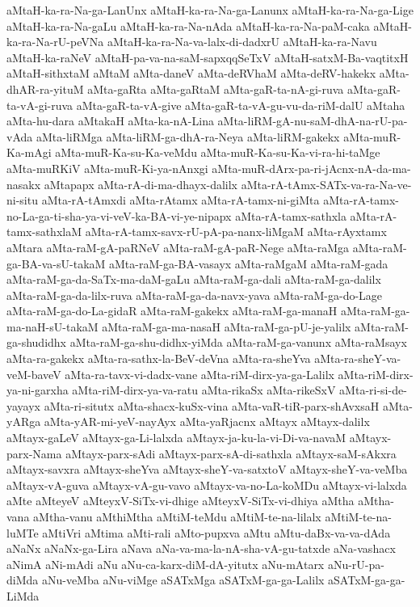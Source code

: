 {aMtaH-ka-ra-Na-ga-LanUnx
aMtaH-ka-ra-Na-ga-Lanunx
aMtaH-ka-ra-Na-ga-Lige
aMtaH-ka-ra-Na-gaLu
aMtaH-ka-ra-Na-nAda
aMtaH-ka-ra-Na-paM-caka
aMtaH-ka-ra-Na-rU-peVNa
aMtaH-ka-ra-Na-va-lalx-di-dadxrU
aMtaH-ka-ra-Navu
aMtaH-ka-raNeV
aMtaH-pa-va-na-saM-sapxqqSeTxV
aMtaH-satxM-Ba-vaqtitxH
aMtaH-sithxtaM
aMtaM
aMta-daneV
aMta-deRVhaM
aMta-deRV-hakekx
aMta-dhAR-ra-yituM
aMta-gaRta
aMta-gaRtaM
aMta-gaR-ta-nA-gi-ruva
aMta-gaR-ta-vA-gi-ruva
aMta-gaR-ta-vA-give
aMta-gaR-ta-vA-gu-vu-da-riM-dalU
aMtaha
aMta-hu-dara
aMtakaH
aMta-ka-nA-Lina
aMta-liRM-gA-nu-saM-dhA-na-rU-pa-vAda
aMta-liRMga
aMta-liRM-ga-dhA-ra-Neya
aMta-liRM-gakekx
aMta-muR-Ka-mAgi
aMta-muR-Ka-su-Ka-veMdu
aMta-muR-Ka-su-Ka-vi-ra-hi-taMge
aMta-muRKiV
aMta-muR-Ki-ya-nAnxgi
aMta-muR-dArx-pa-ri-jAcnx-nA-da-ma-nasakx
aMtapapx
aMta-rA-di-ma-dhayx-dalilx
aMta-rA-tAmx-SATx-va-ra-Na-ve-ni-situ
aMta-rA-tAmxdi
aMta-rAtamx
aMta-rA-tamx-ni-giMta
aMta-rA-tamx-no-La-ga-ti-sha-ya-vi-veV-ka-BA-vi-ye-nipapx
aMta-rA-tamx-sathxla
aMta-rA-tamx-sathxlaM
aMta-rA-tamx-savx-rU-pA-pa-nanx-liMgaM
aMta-rAyxtamx
aMtara
aMta-raM-gA-paRNeV
aMta-raM-gA-paR-Nege
aMta-raMga
aMta-raM-ga-BA-va-sU-takaM
aMta-raM-ga-BA-vasayx
aMta-raMgaM
aMta-raM-gada
aMta-raM-ga-da-SaTx-ma-daM-gaLu
aMta-raM-ga-dali
aMta-raM-ga-dalilx
aMta-raM-ga-da-lilx-ruva
aMta-raM-ga-da-navx-yava
aMta-raM-ga-do-Lage
aMta-raM-ga-do-La-gidaR
aMta-raM-gakekx
aMta-raM-ga-manaH
aMta-raM-ga-ma-naH-sU-takaM
aMta-raM-ga-ma-nasaH
aMta-raM-ga-pU-je-yalilx
aMta-raM-ga-shudidhx
aMta-raM-ga-shu-didhx-yiMda
aMta-raM-ga-vanunx
aMta-raMsayx
aMta-ra-gakekx
aMta-ra-sathx-la-BeV-deVna
aMta-ra-sheYva
aMta-ra-sheY-va-veM-baveV
aMta-ra-tavx-vi-dadx-vane
aMta-riM-dirx-ya-ga-Lalilx
aMta-riM-dirx-ya-ni-garxha
aMta-riM-dirx-ya-va-ratu
aMta-rikaSx
aMta-rikeSxV
aMta-ri-si-de-yayayx
aMta-ri-situtx
aMta-shacx-kuSx-vina
aMta-vaR-tiR-parx-shAvxsaH
aMta-yARga
aMta-yAR-mi-yeV-nayAyx
aMta-yaRjacnx
aMtayx
aMtayx-dalilx
aMtayx-gaLeV
aMtayx-ga-Li-lalxda
aMtayx-ja-ku-la-vi-Di-va-navaM
aMtayx-parx-Nama
aMtayx-parx-sAdi
aMtayx-parx-sA-di-sathxla
aMtayx-saM-sAkxra
aMtayx-savxra
aMtayx-sheYva
aMtayx-sheY-va-satxtoV
aMtayx-sheY-va-veMba
aMtayx-vA-guva
aMtayx-vA-gu-vavo
aMtayx-va-no-La-koMDu
aMtayx-vi-lalxda
aMte
aMteyeV
aMteyxV-SiTx-vi-dhige
aMteyxV-SiTx-vi-dhiya
aMtha
aMtha-vana
aMtha-vanu
aMthiMtha
aMtiM-teMdu
aMtiM-te-na-lilalx
aMtiM-te-na-luMTe
aMtiVri
aMtima
aMti-rali
aMto-pupxva
aMtu
aMtu-daBx-va-va-dAda
aNaNx
aNaNx-ga-Lira
aNava
aNa-va-ma-la-nA-sha-vA-gu-tatxde
aNa-vashacx
aNimA
aNi-mAdi
aNu
aNu-ca-karx-diM-dA-yitutx
aNu-mAtarx
aNu-rU-pa-diMda
aNu-veMba
aNu-viMge
aSATxMga
aSATxM-ga-ga-Lalilx
aSATxM-ga-ga-LiMda
}
